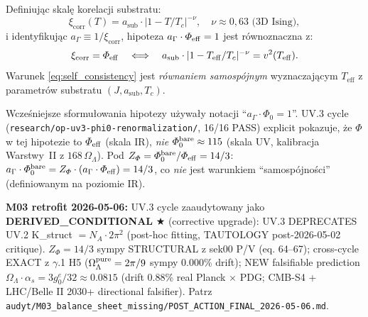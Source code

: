 \begin{propozycja}[Hipoteza $a_\Gamma \cdot \Phi_{\rm eff} = 1$ jako warunek samospójności]
\label{prop:agamma_phi0}
Definiując skalę korelacji substratu:
\begin{equation}
  \xi_\mathrm{corr}(T) = a_\mathrm{sub} \cdot |1 - T/T_c|^{-\nu},
  \quad \nu \approx 0{,}63 \text{ (3D Ising)},
\end{equation}
i identyfikując $a_\Gamma \equiv 1/\xi_\mathrm{corr}$, hipoteza
$a_\Gamma \cdot \Phi_{\rm eff} = 1$ jest równoznaczna z:
\begin{equation}
  \xi_\mathrm{corr} = \Phi_{\rm eff}
  \quad\Longleftrightarrow\quad
  a_\mathrm{sub} \cdot |1 - T_\mathrm{eff}/T_c|^{-\nu} = v^2(T_\mathrm{eff}).
  \label{eq:self_consistency}
\end{equation}
Warunek \eqref{eq:self_consistency} jest \emph{równaniem samospójnym}
wyznaczającym $T_\mathrm{eff}$ z parametrów substratu $(J, a_\mathrm{sub}, T_c)$.
\end{propozycja}

\begin{uwaga}
\label{rem:agamma-Phi-eff-identification}
Wcze\'sniejsze sformu\l{}owania hipotezy u\.zywa\l{}y notacji
``$a_\Gamma \cdot \Phi_0 = 1$''. UV.3 cycle (\texttt{research/op-uv3-phi0-renormalization/},
16/16 PASS) explicit pokazuje, \.ze $\Phi$ w tej hipotezie to
$\Phi_{\rm eff}$ (skala IR), \emph{nie} $\Phi_0^{\rm bare} \approx 115$
(skala UV, kalibracja Warstwy~II z $168\,\Omega_\Lambda$). Pod
$Z_\Phi = \Phi_0^{\rm bare}/\Phi_{\rm eff} = 14/3$:
$a_\Gamma \cdot \Phi_0^{\rm bare} = Z_\Phi \cdot (a_\Gamma \cdot \Phi_{\rm eff}) = 14/3$,
co \emph{nie} jest warunkiem ``samospójno\'sci'' (definiowanym na poziomie IR).

\textbf{M03 retrofit 2026-05-06:} UV.3 cycle zaaudytowany jako
\textbf{DERIVED\_CONDITIONAL} ★ (corrective upgrade): UV.3 DEPRECATES
UV.2 K\_struct $= N_A \cdot 2\pi^2$ (post-hoc fitting, TAUTOLOGY
post-2026-05-02 critique). $Z_\Phi = 14/3$ sympy STRUCTURAL z sek00
P/V (eq. 64--67); cross-cycle EXACT z $\gamma$.1 H5
($\Omega_\Lambda^{\rm pure} = 2\pi/9$ sympy 0.000\% drift); NEW
falsifiable prediction $\Omega_\Lambda \cdot \alpha_s = 3 g_0^e/32
\approx 0.0815$ (drift 0.88\% real Planck $\times$ PDG; CMB-S4 +
LHC/Belle II 2030+ directional falsifier). Patrz
\texttt{audyt/M03\_balance\_sheet\_missing/POST\_ACTION\_FINAL\_2026-05-06.md}.
\end{uwaga}

